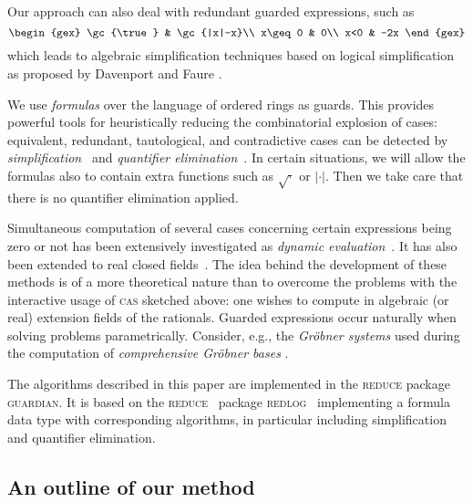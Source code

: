 Our approach can also deal with redundant guarded expressions, such as
$$
\begin{gex}
\gc{\true} & \gc{|x|-x}\\
x\geq0 & 0\\
x<0 & -2x
\end{gex}
$$
which leads to algebraic simplification techniques based on logical
simplification as proposed by Davenport and
Faure \cite{DavenportFaure:94}.

We use {\em formulas} over the language of ordered rings as guards.
This provides powerful tools for heuristically reducing the
combinatorial explosion of cases: equivalent, redundant, tautological,
and contradictive cases can be detected by {\em
simplification}~\cite{DolzmannSturm:95} and {\em quantifier
elimination}~\cite{Tarski:48,Collins:75,Weispfenning:88,LoosWeispfenning:93,Weispfenning:96,Weispfenning:94}.
In certain situations, we will allow the formulas also to contain
extra functions such as $\sqrt{\cdot}$ or $|\cdot|$. Then we take care
that there is no quantifier elimination applied.

Simultaneous computation of several cases concerning certain
expressions being zero or not has been extensively investigated as
{\em dynamic
evaluation}~\cite{GomezDiaz:93,DuvalReynaud:94,DuvalReynaud:94a,
BroadberryGomezDiazWatt:95}. It has also been extended to real closed
fields~\cite{DuvalGonzalesVega:93}. The idea behind the development of
these methods is of a more theoretical nature than to overcome the
problems with the interactive usage of \textsc{cas} sketched above: one
wishes to compute in algebraic (or real) extension fields of the
rationals. Guarded expressions occur naturally when solving problems
parametrically. Consider, e.g., the {\em Gr\"obner systems} used
during the computation of {\em comprehensive Gr\"obner bases}
\cite{Weispfenning:92}.

The algorithms described in this paper are implemented in the 
\textsc{reduce} package \textsc{guardian}. It is based on the 
\textsc{reduce}~\cite{HearnFitch:95,Melenk:95} package 
\textsc{redlog}~\cite{DolzmannSturm:96,DolzmannSturm:96a} implementing a
formula data type with corresponding algorithms, in particular
including simplification and quantifier elimination.

\subsection{An outline of our method}
